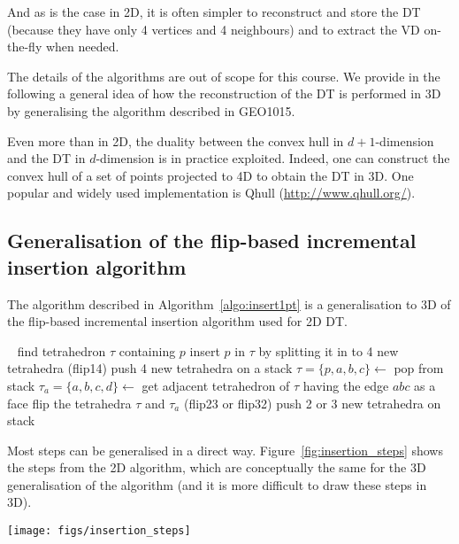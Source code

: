 %

And as is the case in 2D, it is often simpler to reconstruct and store the DT (because they have only 4 vertices and 4 neighbours) and to extract the VD on-the-fly when needed.

%

The details of the algorithms are out of scope for this course.
We provide in the following a general idea of how the reconstruction of the DT is performed in 3D by generalising the algorithm described in GEO1015.

\begin{kaobox}[frametitle=\faCog\ How does it work in practice?]
  Even more than in 2D, the duality between the convex hull in $d+1$-dimension and the DT in $d$-dimension is in practice exploited.
  Indeed, one can construct the convex hull of a set of points projected to 4D to obtain the DT in 3D.
  One popular and widely used implementation is Qhull (\url{http://www.qhull.org/}).
\end{kaobox}


\subsection{Generalisation of the flip-based incremental insertion algorithm}

The algorithm described in Algorithm~\ref{algo:insert1pt} is a generalisation to 3D of the flip-based incremental insertion algorithm used for 2D DT\@.
\begin{algorithm}[tb] 
  \DontPrintSemicolon\
  \KwOut{$\mathcal{T}^{p} = \mathcal{T} \cup \{p\}$}
  find tetrahedron $\tau$ containing $p$\;
  insert $p$ in $\tau$ by splitting it in to 4 new tetrahedra (flip14)\;
  push 4 new tetrahedra on a stack\;
  {
    $\tau = \{p,a,b,c\} \leftarrow$ pop from stack\;
    $\tau_{a} = \{a,b,c,d\} \leftarrow$ get adjacent tetrahedron of $\tau$ having the edge $abc$ as a face\;
    \If{$d$ is inside circumsphere of $\tau$}
    {
      {
        flip the tetrahedra $\tau$ and $\tau_{a}$ (flip23 or flip32)\;
        push 2 or 3 new tetrahedra on stack\;
      }
    }
  }
  \caption{Algorithm to insert one point in a DT}%
\label{algo:insert1pt}
\end{algorithm} 

Most steps can be generalised in a direct way.
Figure~\ref{fig:insertion_steps} shows the steps from the 2D algorithm, which are conceptually the same for the 3D generalisation of the algorithm (and it is more difficult to draw these steps in 3D).
\begin{figure*}
  \centering
  \texttt{[image: figs/insertion\_steps]}
  \caption{Step-by-step insertion, with flips, of a single point in a DT in two dimensions.}%
\label{fig:insertion_steps}
\end{figure*}




